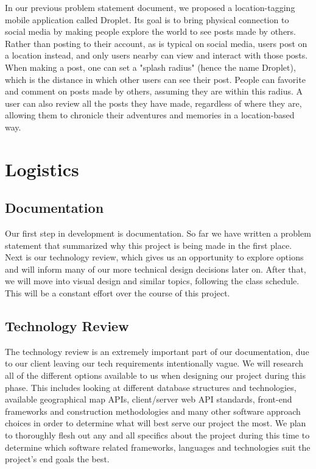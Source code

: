 \documentclass[draftclsnofoot, onecolumn,journal,letterpaper,10pt, compsoc]{IEEEtran}
\begin{document}
In our previous problem statement document, we proposed a location-tagging mobile application called Droplet. Its goal is to bring physical connection to social media by making people explore the world to see posts made by others. Rather than posting to their account, as is typical on social media, users post on a location instead, and only users nearby can view and interact with those posts. When making a post, one can set a "splash radius" (hence the name Droplet), which is the distance in which other users can see their post. People can favorite and comment on posts made by others, assuming they are within this radius. A user can also review all the posts they have made, regardless of where they are, allowing them to chronicle their adventures and memories in a location-based way. 

\section{Logistics}

\subsection{Documentation}
Our first step in development is documentation. So far we have written a problem statement that summarized why this project is being made in the first place. Next is our technology review, which gives us an opportunity to explore options and will inform many of our more technical design decisions later on. After that, we will move into visual design and similar topics, following the class schedule. This will be a constant effort over the course of this project.

\subsection{Technology Review}
The technology review is an extremely important part of our documentation, due to our client leaving our tech requirements intentionally vague. We will research all of the different options available to us when designing our project during this phase. This includes looking at different database structures and technologies, available geographical map APIs, client/server web API standards, front-end frameworks and construction methodologies and many other software approach choices in order to determine what will best serve our project the most.  We plan to thoroughly flesh out any and all specifics about the project during this time to determine which software related frameworks, languages and technologies suit the project's end goals the best.
\end{document}
